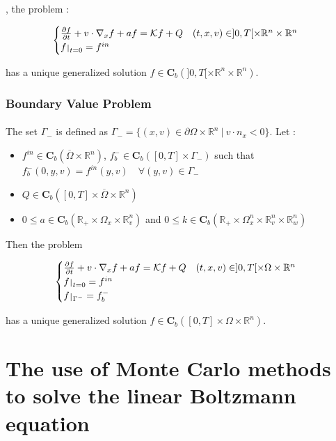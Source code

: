 \documentclass[a4paper, 11pt]{article}
\def\restriction#1#2{\mathchoice
	{\setbox1\hbox{${\displaystyle #1}_{\scriptstyle #2}$}
		\restrictionaux{#1}{#2}}
	{\setbox1\hbox{${\textstyle #1}_{\scriptstyle #2}$}
		\restrictionaux{#1}{#2}}
	{\setbox1\hbox{${\scriptstyle #1}_{\scriptscriptstyle #2}$}
		\restrictionaux{#1}{#2}}
	{\setbox1\hbox{${\scriptscriptstyle #1}_{\scriptscriptstyle #2}$}
		\restrictionaux{#1}{#2}}}
\def\restrictionaux#1#2{{#1\,\smash{\vrule height .8\ht1 depth .85\dp1}}_{\,#2}}
\begin{document}
, the problem :

\[
\begin{cases}
\frac{\partial f}{\partial t}+v \cdot \nabla_x f +af =   \mathcal{K} f +Q \quad (t,x,v) \in ]0,T[ \times \mathbb{R}^n \times \mathbb{R}^n\\
\restriction{f}{t=0}= f^{in}
\end{cases}
\]

has a unique generalized solution $f \in \mathbf{C}_b(]0,T[ \times \mathbb{R}^n \times \mathbb{R}^n)$.

\subsubsection{Boundary Value Problem}

\paragraph{}
The set $\Gamma_-$ is defined as $\Gamma_-= \{(x,v) \in \partial \Omega \times \mathbb{R}^n ~ | ~ v\cdot n_x<0\}$. Let :
\begin{itemize}
	\item $f^{in} \in \mathbf{C}_b(\overline{\Omega} \times \mathbb{R}^n)$, $f_b^- \in \mathbf{C}_b([0,T] \times \Gamma_-)$ such that $f_b^-(0,y,v)=f^{in}(y,v) \quad \forall (y,v) \in \Gamma_-$
	\item $Q \in \mathbf{C}_b([0,T] \times \overline{\Omega} \times \mathbb{R}^n)$
	\item $0 \leq a \in \mathbf{C}_b(\mathbb{R}_+ \times \Omega_x \times \mathbb{R}_v^n)$ and $0 \leq k \in \mathbf{C}_b(\mathbb{R}_+ \times \Omega_x^n \times \mathbb{R}_v^n \times \mathbb{R}_w^n)$
\end{itemize}

Then the problem

\[
\begin{cases}
\frac{\partial f}{\partial t}+v \cdot \nabla_x f +af =   \mathcal{K} f +Q \quad (t,x,v) \in ]0,T[ \times \Omega \times \mathbb{R}^n\\
\restriction{f}{t=0}= f^{in}\\
\restriction{f}{\Gamma^-}=f_b^-
\end{cases}
\]

has a unique generalized solution $f \in \mathbf{C}_b([0,T] \times \Omega \times \mathbb{R}^n)$.

\section{The use of Monte Carlo methods to solve the linear Boltzmann equation}
\end{document}
